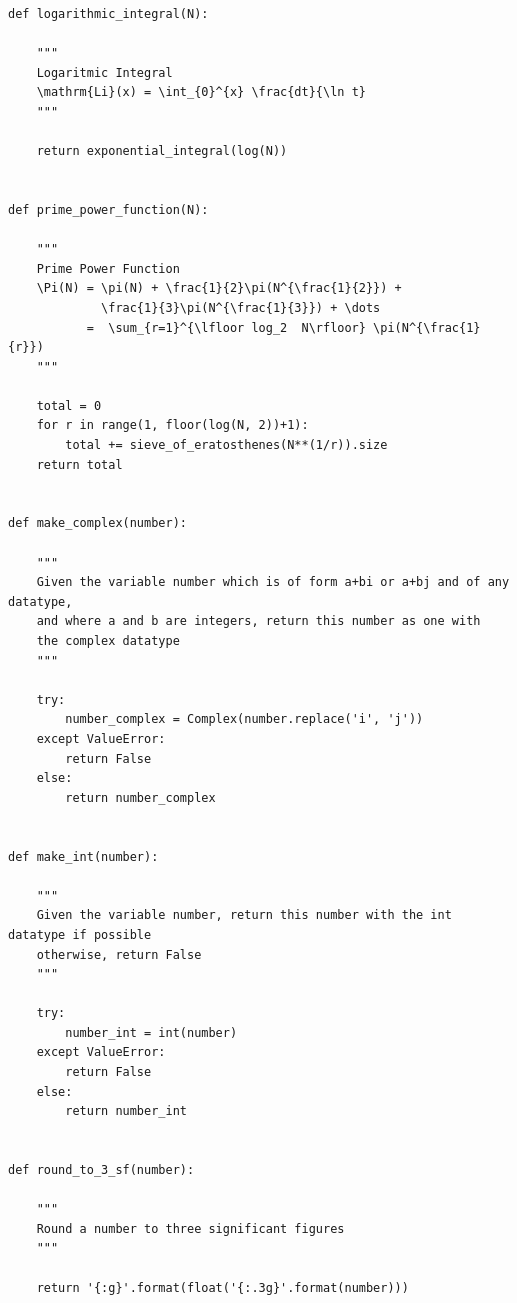\documentclass[12pt]{article}
\begin{document}
\begin{lstlisting}
def logarithmic_integral(N):

    """
    Logaritmic Integral
    \mathrm{Li}(x) = \int_{0}^{x} \frac{dt}{\ln t}
    """

    return exponential_integral(log(N))


def prime_power_function(N):

    """
    Prime Power Function
    \Pi(N) = \pi(N) + \frac{1}{2}\pi(N^{\frac{1}{2}}) +
             \frac{1}{3}\pi(N^{\frac{1}{3}}) + \dots
           =  \sum_{r=1}^{\lfloor log_2  N\rfloor} \pi(N^{\frac{1}{r}})
    """

    total = 0
    for r in range(1, floor(log(N, 2))+1):
        total += sieve_of_eratosthenes(N**(1/r)).size
    return total


def make_complex(number):

    """
    Given the variable number which is of form a+bi or a+bj and of any datatype,
    and where a and b are integers, return this number as one with
    the complex datatype
    """

    try:
        number_complex = Complex(number.replace('i', 'j'))
    except ValueError:
        return False
    else:
        return number_complex


def make_int(number):

    """
    Given the variable number, return this number with the int datatype if possible
    otherwise, return False
    """

    try:
        number_int = int(number)
    except ValueError:
        return False
    else:
        return number_int


def round_to_3_sf(number):

    """
    Round a number to three significant figures
    """

    return '{:g}'.format(float('{:.3g}'.format(number)))
\end{lstlisting}
\end{document}

